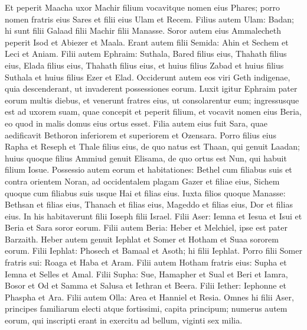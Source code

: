 \begin{biblechapter}
\begin{biblechapter}
\begin{biblechapter}
\begin{biblechapter}
\begin{biblechapter}
\begin{biblechapter}
\begin{biblechapter}
\verse Et peperit Maacha uxor Machir filium vocavitque nomen eius Phares; porro nomen fratris eius Sares et filii eius Ulam et Recem. 
 \verse Filius autem Ulam: Badan; hi sunt filii Galaad filii Machir filii Manasse. 
 \verse Soror autem eius Ammalecheth peperit Isod et Abiezer et Maala. 
\verse Erant autem filii Semida: Ahin et Sechem et Leci et Aniam.
 \verse Filii autem Ephraim: Suthala, Bared filius eius, Thahath filius eius, Elada filius eius, Thahath filius eius, 
\verse et huius filius Zabad et huius filius Suthala et huius filius Ezer et Elad. Occiderunt autem eos viri Geth indigenae, quia descenderant, ut invaderent possessiones eorum. 
\verse Luxit igitur Ephraim pater eorum multis diebus, et venerunt fratres eius, ut consolarentur eum; 
 \verse ingressusque est ad uxorem suam, quae concepit et peperit filium, et vocavit nomen eius Beria, eo quod in malis domus eius ortus esset. 
\verse Filia autem eius fuit Sara, quae aedificavit Bethoron inferiorem et superiorem et Ozensara. 
 \verse Porro filius eius Rapha et Reseph et Thale filius eius, de quo natus est Thaan, 
\verse qui genuit Laadan; huius quoque filius Ammiud genuit Elisama, 
\verse de quo ortus est Nun, qui habuit filium Iosue. 
\verse Possessio autem eorum et habitationes: Bethel cum filiabus suis et contra orientem Noran, ad occidentalem plagam Gazer et filiae eius, Sichem quoque cum filiabus suis usque Hai et filias eius. 
\verse Iuxta filios quoque Manasse: Bethsan et filias eius, Thanach et filias eius, Mageddo et filias eius, Dor et filias eius. In his habitaverunt filii Ioseph filii Israel.
 \verse Filii Aser: Iemna et Iesua et Isui et Beria et Sara soror eorum. 
\verse Filii autem Beria: Heber et Melchiel, ipse est pater Barzaith. 
\verse Heber autem genuit Iephlat et Somer et Hotham et Suaa sororem eorum. 
\verse Filii Iephlat: Phosech et Bamaal et Asoth; hi filii Iephlat. 
\verse Porro filii Somer fratris sui: Roaga et Haba et Aram. 
\verse Filii autem Hotham fratris eius: Supha et Iemna et Selles et Amal. 
\verse Filii Supha: Sue, Hamapher et Sual et Beri et Iamra, 
\verse Bosor et Od et Samma et Salusa et Iethran et Beera. 
\verse Filii Iether: Iephonne et Phaspha et Ara. 
\verse Filii autem Olla: Area et Hanniel et Resia. 
\verse Omnes hi filii Aser, principes familiarum electi atque fortissimi, capita principum; numerus autem eorum, qui inscripti erant in exercitu ad bellum, viginti sex milia.
 

\end{biblechapter}
\end{biblechapter}
\end{biblechapter}
\end{biblechapter}
\end{biblechapter}
\end{biblechapter}
\end{biblechapter}
